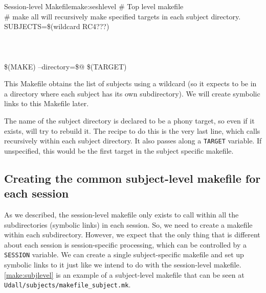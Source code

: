 
\begin{make}{Session-level Makefile}{make:seshlevel}
	\# Top level makefile \\
	\# make all will recursively make specified targets in each subject directory.\\
	
	SUBJECTS=\$(wildcard RC4???) \\
	
	 \\

	
	 \\
	
	 \\
	\tab \$(MAKE) --directory=\$@ \$(TARGET)  \\
	
\end{make}

This Makefile obtains the list of subjects using a wildcard (so it expects to be in a directory where each subject has its own subdirectory). We will create symbolic links to this Makefile later.

The name of the subject directory is declared to be a phony target, so even if it exists, \maken{} will try to rebuild it. The recipe to do this is the very last line, which calls \maken{} recursively within each subject directory. It also passes along a \texttt{TARGET} variable. If unspecified, this would be the first target in the subject specific makefile.

\subsection{Creating the common subject-level makefile for each session}
As we described, the session-level makefile only exists to call \maken{} within all the subdirectories (symbolic links) in each session. So, we need to create a makefile within each subdirectory. However, we expect that the only thing that is different about each session is session-specific processing, which can be controlled by a \texttt{SESSION} variable. We can create a single subject-specific makefile and set up symbolic links to it just like we intend to do with the session-level makefile. \autoref{make:subjlevel} is an example of a subject-level makefile that can be seen at \texttt{Udall/subjects/makefile_subject.mk}.

